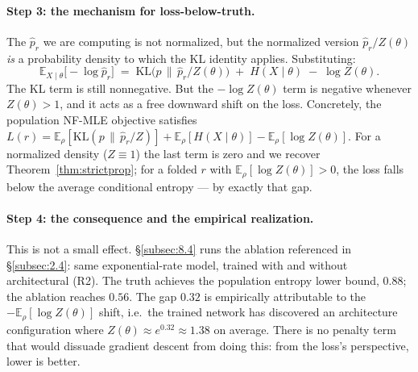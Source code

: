 \documentclass[11pt]{article}
\begin{document}
\paragraph{Step 3: the mechanism for loss-below-truth.}
The \(\hat p_r\) we are computing is not normalized, but the normalized
version \(\hat p_r / Z(\theta)\) \emph{is} a probability density to which
the KL identity applies. Substituting:
\[
\mathbb{E}_{X \mid \theta}\bigl[-\log \hat p_r\bigr]
\;=\;
\mathrm{KL}\!\bigl(p \,\big\|\, \hat p_r / Z(\theta)\bigr)
\;+\; H(X \mid \theta)
\;-\; \log Z(\theta).
\]
The KL term is still nonnegative. But the \(-\log Z(\theta)\) term is
negative whenever \(Z(\theta) > 1\), and it acts as a free downward
shift on the loss. Concretely, the population NF-MLE objective
satisfies
\(L(r) = \mathbb{E}_\rho[\mathrm{KL}(p \,\|\, \hat p_r/Z)] + \mathbb{E}_\rho[H(X \mid \theta)] - \mathbb{E}_\rho[\log Z(\theta)]\).
For a normalized density (\(Z \equiv 1\)) the last term is zero and we
recover Theorem~\ref{thm:strictprop}; for a folded \(r\) with
\(\mathbb{E}_\rho[\log Z(\theta)] > 0\), the loss falls below the
average conditional entropy --- by exactly that gap.

\paragraph{Step 4: the consequence and the empirical realization.}
This is not a small effect. \S\ref{subsec:8.4} runs the ablation
referenced in \S\ref{subsec:2.4}: same exponential-rate model, trained
with and without architectural (R2). The truth achieves the population
entropy lower bound, \(0.88\); the ablation reaches \(0.56\). The gap
\(0.32\) is empirically attributable to the
\(-\mathbb{E}_\rho[\log Z(\theta)]\) shift, i.e.\ the trained network
has discovered an architecture configuration where \(Z(\theta) \approx e^{0.32} \approx 1.38\)
on average. There is no penalty term that would dissuade gradient descent
from doing this: from the loss's perspective, lower is better.
\end{document}
